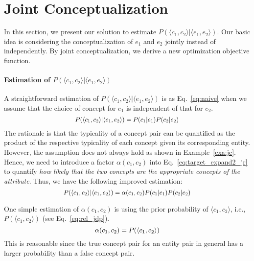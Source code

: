 
\section{Joint Conceptualization}
In this section, we present our solution to estimate $ P(\langle c_1,c_2 \rangle | \langle e_1,e_2\rangle) $.
Our basic idea is considering the conceptualization of $e_1$ and $e_2$ jointly instead of independently.
By joint conceptualization, we derive a new optimization objective function.


\paragraph{Estimation of $P(\langle c_1,c_2\rangle | \langle e_1,e_2\rangle)$ }
A straightforward estimation of $P( \langle c_{1},c_{2} \rangle | \langle e_{1},e_{2} \rangle )$ is as Eq.~\ref{eq:naive} when we assume that the choice of concept for $e_1$ is independent of that for $e_2$.
\begin{equation}
\label{eq:naive}
\small
\begin{split}
P(\langle c_{1},c_{2}\rangle |\langle e_{1},e_{2} \rangle) = P(c_1|e_1) P(c_2|e_2)
\end{split}
\end{equation} The rationale is that the typicality of a concept pair can be quantified as the product of the respective typicality of each concept given its corresponding entity.
However, the assumption does not always hold as shown in Example~\ref{exa:jc}. Hence, we need to introduce a factor $\alpha(c_1,c_2)$ into Eq.~\ref{eq:target_expand2_jr} to quantify {\it how likely that the two concepts are the appropriate concepts of the attribute}. Thus, we have the following improved estimation:
\begin{equation}
\label{eq:target_expand2_jr}
\small
\begin{split}
P(\langle c_{1},c_{2}\rangle |\langle e_{1},e_{2} \rangle) = \alpha(c_1,c_2)  P(c_1|e_1)  P(c_2|e_2)
\end{split}
\end{equation}


One simple estimation of $\alpha(c_1,c_2)$ is using the prior probability of $\langle c_1, c_2\rangle$, i.e., $P(\langle c_1,c_2\rangle)$ (see Eq.~\ref{eq:rel_jdp}).
\begin{equation}\label{eq:rel_jdp}
\small
  \alpha(c_1,c_2) = P(\langle c_1, c_2\rangle)
\end{equation}
This is reasonable since the true concept pair for an entity pair in general has a larger probability than
a false concept pair.

